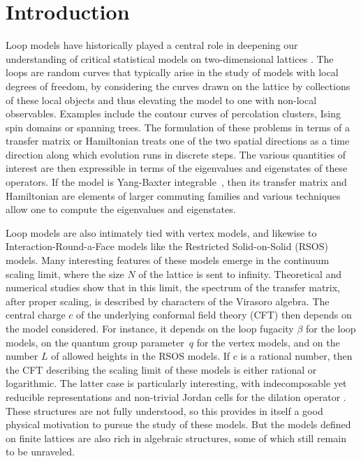 \documentclass[11pt]{article}
\numberwithin{equation}{section}
\theoremstyle{alexi}
\begin{document}
%
%

\newpage
\tableofcontents
\clearpage

%
\section{Introduction} \label{sec:intro}
%

Loop models have historically played a central role in deepening our understanding of critical  statistical models on two-dimensional lattices \cite{J09}. The loops are random curves that typically arise in the study of models with local degrees of freedom, by considering the curves drawn on the lattice by collections of these local objects and thus elevating the model to one with non-local observables. Examples include the contour curves of percolation clusters, Ising spin domains or spanning trees. The formulation of these problems in terms of a transfer matrix or Hamiltonian treats one of the two spatial directions as a time direction along which evolution runs in discrete steps. The various quantities of interest are then expressible in terms of the eigenvalues and eigenstates of these operators. If the model is Yang-Baxter integrable~\cite{BAXTER}, then its transfer matrix and Hamiltonian are elements of larger commuting families and various techniques allow one to compute the eigenvalues and eigenstates. 

Loop models are also intimately tied with vertex models, and likewise to Interaction-Round-a-Face models like the Restricted Solid-on-Solid (RSOS) models. Many interesting features of these models emerge in the continuum scaling limit, where the size $N$ of the lattice is sent to infinity. Theoretical and numerical studies show that in this limit, the spectrum of the transfer matrix, after proper scaling, is described by characters of the Virasoro algebra. The central charge $c$ of the underlying conformal field theory (CFT) then depends on the model considered. For instance, it depends on the loop fugacity $\beta$ for the loop models, on the quantum group parameter~$q$ for the vertex models, and on the number $L$ of allowed heights in the RSOS models. If $c$ is a rational number, then the CFT describing the scaling limit of these models is either rational or logarithmic. The latter case is particularly interesting, with indecomposable yet reducible representations and non-trivial Jordan cells for the dilation operator \cite{Gurarie,PPJRJBZ06,SpecialIssue}. These structures are not fully understood, so this provides in itself a good physical motivation to pursue the study of these models. But the models defined on finite lattices are also rich in algebraic structures, some of which still remain to be unraveled.
\end{document}
